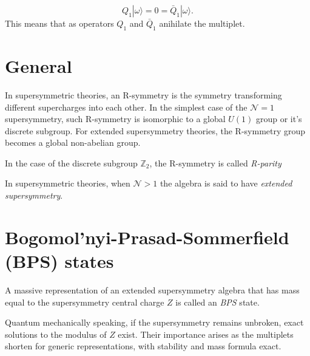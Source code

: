 \begin{equation}
  Q_1|\omega\rangle = 0 = \bar{Q}_{\dot{1}}|\omega\rangle.
\end{equation}
This means that as operators $Q_1$ and $\bar{Q}_{\dot{1}}$ anihilate the
multiplet. 


\section{General}
\begin{definition}[R-symmetry]
In supersymmetric theories, an R-symmetry is the symmetry transforming different supercharges into each other. In the simplest case of the $\mathcal{N}=1$ supersymmetry, such R-symmetry is isomorphic to a global $U(1)$ group or it's discrete subgroup. For extended supersymmetry theories, the R-symmetry group becomes a global non-abelian group.  
\end{definition}

\begin{remark}
In the case of the discrete subgroup $\mathbb{Z}_2$, the R-symmetry is called \textit{R-parity}
\end{remark}

\begin{definition}
In supersymmetric theories, when $\mathcal{N}>1$ the algebra is said to have
\textit{extended supersymmetry}.
\end{definition}

\section{Bogomol'nyi-Prasad-Sommerfield (BPS) states}
\begin{definition}
A massive representation of an extended supersymmetry algebra that has mass
equal to the supersymmetry central charge $Z$ is called an \textit{BPS} state.
\end{definition}

Quantum mechanically speaking, if the supersymmetry remains unbroken, exact
solutions to the modulus of $Z$ exist. Their importance arises as the
multiplets shorten for generic representations, with stability and mass formula
exact.

